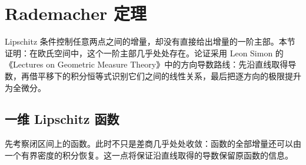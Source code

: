 \section{Rademacher 定理}
\label{b1:sec:1602}

Lipschitz 条件控制任意两点之间的增量，却没有直接给出增量的一阶主部。本节证明：在欧氏空间中，这个一阶主部几乎处处存在。论证采用 Leon Simon 的《Lectures on Geometric Measure Theory》\cite[5.2 THEOREM, pp. 30--32]{Simon1983Lectures}中的方向导数路线：先沿直线取得导数，再借平移下的积分恒等式识别它们之间的线性关系，最后把逐方向的极限提升为全微分。


\subsection{一维 Lipschitz 函数}
\label{b1:subsec:160201}

先考察闭区间上的函数。此时不只是差商几乎处处收敛：函数的全部增量还可以由一个有界密度的积分恢复。这一点将保证沿直线取得的导数保留原函数的信息。

